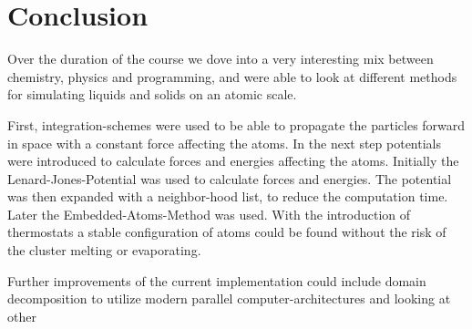 \chapter{Conclusion}
\begin{comment}
- give look at stuff i did and did not
- mention all the other cool stuff, parralell hardware memes domain decompasition looking at other mechanical parameters ia stress
- should be written nice if i wanna work with those guys
-btw the github is actually hilarious although a c++ project over 80%
- personal ?! nah
\end{comment}

Over the duration of the course we dove into a very interesting mix between chemistry, physics and programming, and were able to look at different methods for simulating liquids and solids on an atomic scale.
\par 
First, integration-schemes were used to be able to propagate the particles forward in space with a constant force affecting the atoms. In the next step potentials were introduced to calculate forces and energies affecting the atoms. Initially the Lenard-Jones-Potential was used to calculate forces and energies. The potential was then expanded with a neighbor-hood list, to reduce the computation time. Later the Embedded-Atoms-Method was used. With the introduction of thermostats a stable configuration of atoms could be found without the risk of the cluster melting or evaporating. 
\par
Further improvements of the current implementation could include domain decomposition to utilize modern parallel computer-architectures and looking at other 
